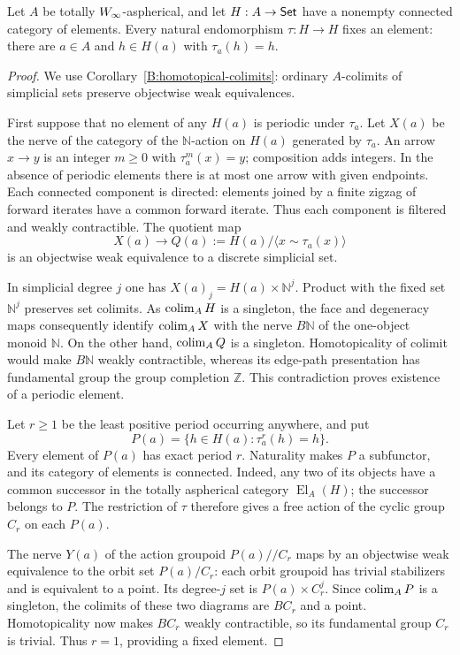 \begin{proposition}\label{D:fixed-points}
Let $A$ be totally $W_{\infty}$-aspherical, and let $H:A\to\mathsf{Set}$ have a
nonempty connected category of elements. Every natural endomorphism
$\tau:H\to H$ fixes an element: there are $a\in A$ and $h\in H(a)$ with
$\tau_a(h)=h$.
\end{proposition}
\begin{proof}
We use Corollary~\ref{B:homotopical-colimits}: ordinary $A$-colimits of
simplicial sets preserve objectwise weak equivalences.

First suppose that no element of any $H(a)$ is periodic under $\tau_a$.
Let $X(a)$ be the nerve of the category of the $\mathbb N$-action on
$H(a)$ generated by $\tau_a$. An arrow $x\to y$ is an integer $m\geq0$
with $\tau_a^m(x)=y$; composition adds integers. In the absence of periodic
elements there is at most one arrow with given endpoints. Each connected
component is directed: elements joined by a finite zigzag of forward
iterates have a common forward iterate. Thus each component is filtered
and weakly contractible. The quotient map
\[
 X(a)\longrightarrow Q(a):=H(a)/\langle x\sim\tau_a(x)\rangle
\]
is an objectwise weak equivalence to a discrete simplicial set.

In simplicial degree $j$ one has $X(a)_j=H(a)\times\mathbb N^j$.
Product with the fixed set $\mathbb N^j$ preserves set colimits.
As $\operatorname{colim}_AH$ is a singleton, the face and degeneracy maps consequently
identify $\operatorname{colim}_AX$ with the nerve $B\mathbb N$ of the one-object monoid
$\mathbb N$. On the other hand, $\operatorname{colim}_AQ$ is a singleton. Homotopicality
of colimit would make $B\mathbb N$ weakly contractible, whereas its
edge-path presentation has fundamental group the group completion
$\mathbb Z$. This contradiction proves existence of a periodic element.

Let $r\geq1$ be the least positive period occurring anywhere, and put
\[
 P(a)=\{h\in H(a):\tau_a^r(h)=h\}.
\]
Every element of $P(a)$ has exact period $r$. Naturality makes $P$ a
subfunctor, and its category of elements is connected. Indeed, any two
of its objects have a common successor in the totally aspherical
category $\operatorname{El}_A(H)$; the successor belongs to $P$.
The restriction of $\tau$ therefore gives a free action of the cyclic
group $C_r$ on each $P(a)$.

The nerve $Y(a)$ of the action groupoid $P(a)//C_r$ maps by an objectwise
weak equivalence to the orbit set $P(a)/C_r$: each orbit groupoid has
trivial stabilizers and is equivalent to a point. Its degree-$j$ set is
$P(a)\times C_r^j$. Since $\operatorname{colim}_AP$ is a singleton, the colimits of
these two diagrams are $BC_r$ and a point. Homotopicality now makes
$BC_r$ weakly contractible, so its fundamental group $C_r$ is trivial.
Thus $r=1$, providing a fixed element.
\end{proof}

